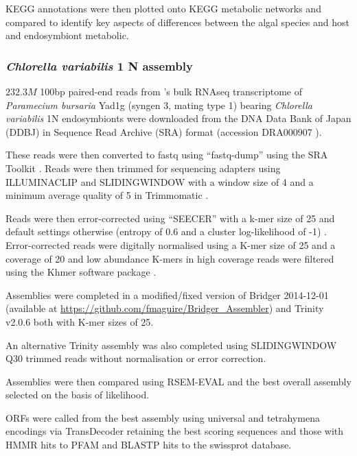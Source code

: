 KEGG annotations were then plotted onto KEGG metabolic networks and compared 
to identify key aspects of differences between the algal species and
host and endosymbiont metabolic.

\subsubsection{\textit{Chlorella variabilis} 1 N assembly}
\(232.3M\) 100bp paired-end reads from \citep{Kodama2014}'s 
bulk RNAseq transcriptome of \textit{Paramecium bursaria} Yad1g (syngen
3, mating type 1) bearing \textit{Chlorella variabilis} 1N endosymbionts
were downloaded from the DNA Data Bank of Japan (DDBJ) \citep{Tateno2002,Kaminuma2011}
in Sequence Read Archive (SRA) format \citep{Leinonen2011,KodamaNRA2012b} (accession DRA000907 \citep{Kodama2014}).

These reads were then converted to fastq using ``fastq-dump'' using the SRA Toolkit
\citep{NationalCenterforBiotechnologyInformation2011}.  Reads were then trimmed
for sequencing adapters using ILLUMINACLIP and SLIDINGWINDOW with a window size
of 4 and a minimum average quality of 5 in Trimmomatic \citep{Bolger2014a}.

Reads were then error-corrected using ``SEECER'' with a k-mer size of 25 and 
default settings otherwise (entropy of 0.6 and a cluster log-likelihood
of -1) \citep{Le2013}.  Error-corrected reads were digitally normalised
using a K-mer size of 25 and a coverage of 20 \citep{Brown2012} and 
low abundance K-mers in high coverage reads were filtered \citep{Zhang2014,Zhang2015}
using the Khmer software package \citep{Doring2008,Crusoe2015}.

Assemblies were completed in a modified/fixed version of 
Bridger 2014-12-01 \citep{Chang2015} (available at
\url{https://github.com/fmaguire/Bridger_Assembler}) and 
Trinity v2.0.6 \citep{Grabherr2011,Haas2013} both with K-mer
sizes of 25.

An alternative Trinity assembly was also completed using
SLIDINGWINDOW Q30 trimmed reads without normalisation or 
error correction.

Assemblies were then compared using RSEM-EVAL \citep{Li2014} and the best
overall assembly selected on the basis of likelihood.

ORFs were called from the best assembly using universal and tetrahymena encodings 
via TransDecoder \citep{Haas2013} retaining the best scoring sequences and those
with HMMR hits to PFAM and BLASTP hits to the swissprot database. 

